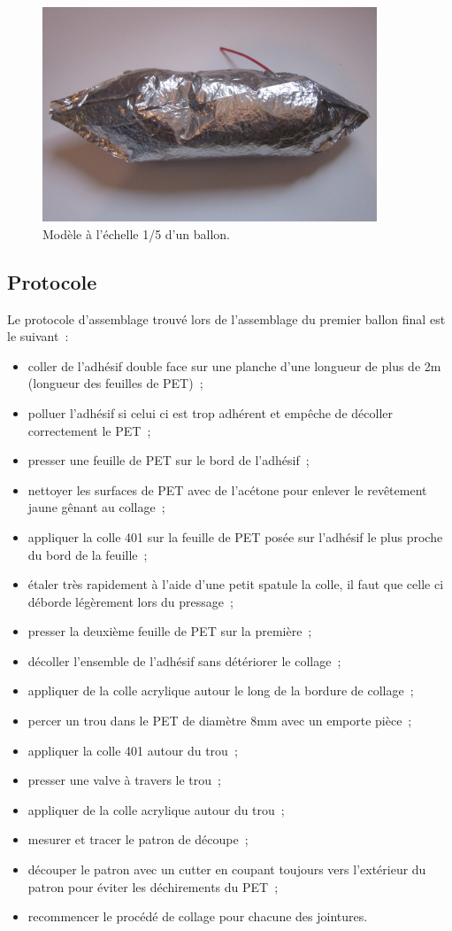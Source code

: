 \documentclass[a4paper,11pt]{article}
\begin{document}
\begin{figure}[H]
 \centering
 \includegraphics[width=10cm]{../Images/ballon4.JPG}
 \caption{Modèle à l'échelle 1/5 d'un ballon.}
\end{figure}

\subsection{Protocole}

Le protocole d'assemblage trouvé lors de l'assemblage du premier ballon final est le suivant~:
\begin{itemize}
 \item coller de l'adhésif double face sur une planche d'une longueur de plus de 2m (longueur des feuilles de PET)~;
 \item polluer l'adhésif si celui ci est trop adhérent et empêche de décoller correctement le PET~;
 \item presser une feuille de PET sur le bord de l'adhésif~;
 \item nettoyer les surfaces de PET avec de l'acétone pour enlever le revêtement jaune gênant au collage~;
 \item appliquer la colle 401 sur la feuille de PET posée sur l'adhésif le plus proche du bord de la feuille~;
 \item étaler très rapidement à l'aide d'une petit spatule la colle, il faut que celle ci déborde légèrement lors du pressage~;
 \item presser la deuxième feuille de PET sur la première~;
 \item décoller l'ensemble de l'adhésif sans détériorer le collage~;
 \item appliquer de la colle acrylique autour le long de la bordure de collage~;
 \item percer un trou dans le PET de diamètre 8mm avec un emporte pièce~;
 \item appliquer la colle 401 autour du trou~;
 \item presser une valve à travers le trou~;
 \item appliquer de la colle acrylique autour du trou~;
 \item mesurer et tracer le patron de découpe~;
 \item découper le patron avec un cutter en coupant toujours vers l'extérieur du patron pour éviter les déchirements du PET~;
 \item recommencer le procédé de collage pour chacune des jointures.
\end{itemize}
\end{document}
